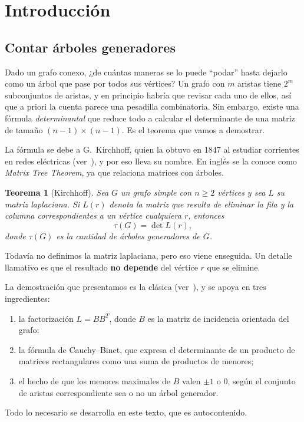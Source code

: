 \documentclass[12pt,a4paper]{article}
\theoremstyle{profesional}
\newtheorem{teorema}{Teorema}[subsection]
\theoremstyle{definicion-style}
\theoremstyle{observacion-style}
\begin{document}
\newpage

\tableofcontents
\thispagestyle{empty}
\newpage

\section{Introducción}

\subsection{Contar árboles generadores}

Dado un grafo conexo, ¿de cuántas maneras se lo puede ``podar'' hasta dejarlo como un árbol que pase por todos sus vértices? Un grafo con \( m \) aristas tiene \( 2^m \) subconjuntos de aristas, y en principio habría que revisar
cada uno de ellos, así que a priori la cuenta parece una pesadilla combinatoria. Sin embargo, existe una fórmula \emph{determinantal} que reduce todo a calcular el determinante de una matriz de tamaño \( (n-1) \times (n-1) \). Es el teorema que vamos a demostrar.

La fórmula se debe a G.~Kirchhoff, quien la obtuvo en 1847 al estudiar corrientes en redes eléctricas (ver~\cite{kirchhoff}), y por eso lleva su nombre. En inglés se la conoce como \emph{Matrix Tree Theorem}, ya que relaciona matrices con árboles.

\begin{teorema}[Kirchhoff]\label{teo:kirchhoff}
    Sea \( G \) un grafo simple con \( n \geq 2 \) vértices y sea \( L \) su matriz laplaciana. Si \( L(r) \) denota la matriz que resulta de eliminar la fila y la columna correspondientes a un vértice cualquiera \( r \), entonces
    \[
        \tau(G) = \det L(r),
    \]
    donde \( \tau(G) \) es la cantidad de árboles generadores de \( G \).
\end{teorema}

Todavía no definimos la matriz laplaciana, pero eso viene enseguida. Un detalle llamativo es que el resultado \textbf{no depende} del vértice \( r \) que se elimine.

La demostración que presentamos es la clásica (ver~\cite{west}), y se apoya en tres ingredientes:
\begin{enumerate}[label=\arabic*.]
    \item la factorización \( L = B B^{T} \), donde \( B \) es la matriz de incidencia orientada del grafo;
    \item la fórmula de Cauchy--Binet, que expresa el determinante de un producto de matrices rectangulares como una suma de productos de menores;
    \item el hecho de que los menores maximales de \( B \) valen \( \pm 1 \) o \( 0 \), según el conjunto de aristas correspondiente sea o no un árbol generador.
\end{enumerate}
Todo lo necesario se desarrolla en este texto, que es autocontenido.
\end{document}
